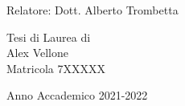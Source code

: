 \begin{titlepage}
\begin{center}
    \vfill
    \vspace{3cm}
    \begin{large}
      Relatore: Dott. Alberto Trombetta

      \vspace{1.0cm}
      Tesi di Laurea di\\
      Alex Vellone\\
      Matricola 7XXXXX\\
      \vspace{0.5cm}

    \end{large}

    Anno Accademico 2021-2022

  \end{center}
\end{titlepage}
